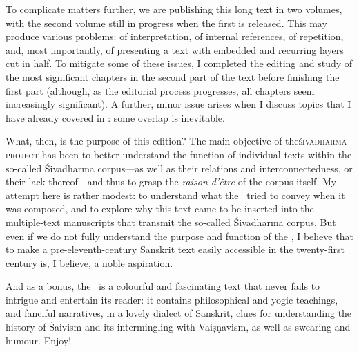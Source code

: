 To complicate matters further, we are publishing this long text
in two volumes, with the second volume still in progress
when the first is released. This may produce various problems:
of interpretation, of internal references, of repetition, 
and, most importantly, of presenting a text with
embedded and recurring layers cut in half. To mitigate
some of these issues, I completed the editing and
study of the most significant chapters in 
the second part of the text
before finishing the first part
(although, as the editorial process progresses, all chapters seem increasingly significant). 
A further, minor issue arises when I discuss topics that I have already covered in : 
some overlap is inevitable.

What, then, is the purpose of this edition? The main 
objective of the\linebreak \textsc{śiva\-dharma project} 
has been to better understand the function of 
individual texts within the so-called Śivadharma corpus---as
well as their relations and interconnectedness, or their
lack thereof---and thus to grasp 
the \emph{raison d'être} of the corpus itself. 
My attempt here is rather modest: to understand
what the \Vss\ tried to convey when it was composed, and
to explore why this text came to be inserted into the multiple-text 
manuscripts that transmit the so-called Śivadharma corpus.
But even if we do not fully understand the purpose and function of the \Vss, 
I believe that to make a pre-eleventh-century
Sanskrit text easily accessible in the twenty-first century is,
I believe, a noble aspiration.

And as a bonus, the \Vss\ is a colourful and fascinating text that never fails to intrigue and entertain its reader:
it contains philosophical and yogic teachings, and fanciful narratives, in a lovely dialect of Sanskrit,
clues for understanding the history of Śaivism and its intermingling with Vaiṣṇavism,
as well as swearing and humour. Enjoy!

\vfill
\pagebreak






